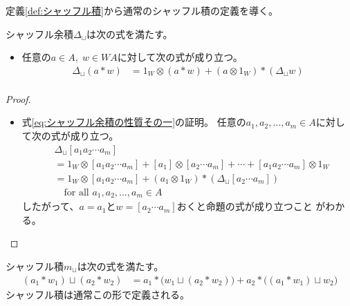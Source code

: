 		定義\ref{def:シャッフル積}から通常のシャッフル積の定義を導く。
		\begin{proposition}[シャッフル余積の性質]\label{prop:シャッフル余積の性質} %
			シャッフル余積$\Delta_\sqcup$は次の式を満たす。
			\begin{itemize}\setlength{\itemsep}{-1mm} %
				\item 任意の$a\in A,\;w\in WA$に対して次の式が成り立つ。
				\begin{equation}\label{eq:シャッフル余積の性質その一}\begin{split} %
					\Delta_\sqcup(a*w) &= 1_W\otimes (a*w) 
						+ (a\otimes 1_W)*(\Delta_{\sqcup}w) \\
				\end{split}\end{equation} %
			\end{itemize} %
		\end{proposition} %
		\begin{proof} %
			\begin{itemize}\setlength{\itemsep}{-1mm} %
				\item 式\eqref{eq:シャッフル余積の性質その一}の証明。
				任意の$a_1,a_2,\dots,a_m\in A$に対して次の式が成り立つ。
				\begin{equation*}\begin{split} %
						& \Delta_\sqcup[a_1a_2\cdots a_m] \\
						& = 1_W\otimes [a_1a_2\cdots a_m]
						+ [a_1]\otimes [a_2\cdots a_m] + \cdots 
						+ [a_1a_2\cdots a_m]\otimes 1_W 
						\\
						& = 1_W\otimes [a_1a_2\cdots a_m] 
						+ (a_1\otimes 1_W)*(\Delta_\sqcup [a_2\cdots a_m])
						\\
						& \quad\text{for all }a_1,a_2,\dots,a_m\in A
				\end{split}\end{equation*} %
				したがって、$a=a_1$と$w=[a_2\cdots a_m]$おくと命題の式が成り立つこと
				がわかる。
			\end{itemize} %
		\end{proof} %
		\begin{proposition}[通常のシャッフル積の定義]\label{prop:通常のシャッフル積の定義} %
			シャッフル積$m_\sqcup$は次の式を満たす。
			\begin{equation*}\begin{split} %
				(a_1*w_1)\sqcup(a_2*w_2) &= a_1*\bigl(w_1\sqcup (a_2*w_2)\bigr)
					+ a_2*\bigl((a_1*w_1)\sqcup w_2\bigr)
			\end{split}\end{equation*} %
			シャッフル積は通常この形で定義される。
		\end{proposition} %
